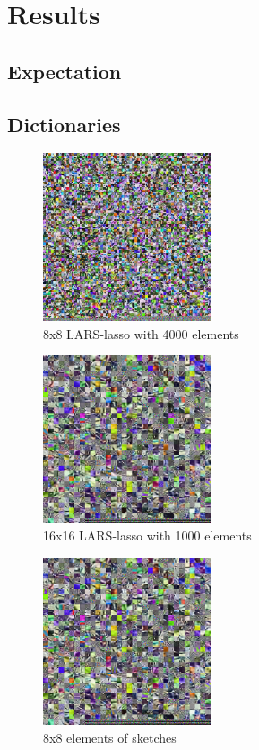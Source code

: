 \chapter{Results}

\section{Expectation}

\section{Dictionaries}

\begin{figure}
\centering
\includegraphics[width = 0.44\textwidth]{images/8_4000_10000_10_lasso.png} 
\caption{8x8 LARS-lasso with 4000 elements}
\label{fig:8_4000_lasso}
\end{figure}


\begin{figure}
\centering
\includegraphics[width = 0.44\textwidth]{images/16_1000_1000_10_lasso.png}
\caption{16x16 LARS-lasso with 1000 elements}
\label{fig:16_1000_lasso}
\end{figure}


\begin{figure}
\centering
\includegraphics[width = 0.44\textwidth]{images/16_1000_1000_10_lasso.png}
\caption{8x8 elements of sketches}
\label{fig:16_1000_lasso}
\end{figure}

